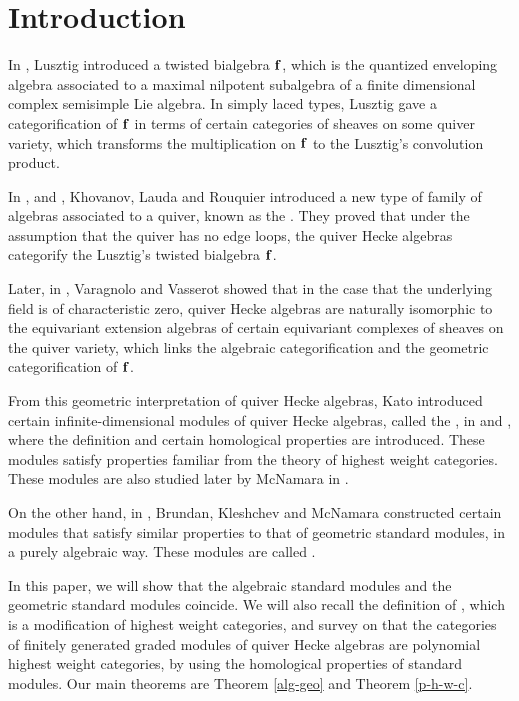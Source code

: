 
\chapter{Introduction}

In \cite{L}, Lusztig introduced a twisted bialgebra $\mathbf{f}$, which is 
the quantized enveloping algebra associated to a maximal nilpotent 
subalgebra of a finite dimensional complex semisimple Lie algebra.
In simply laced types, Lusztig gave a categorification of $\mathbf{f}$ in terms of certain
categories of sheaves on some quiver variety, which transforms
the multiplication on $\mathbf{f}$ to the Lusztig's convolution product.

In \cite{KL1}, \cite{KL2} and \cite{R}, Khovanov, Lauda and Rouquier
introduced a new type of family of algebras associated to a quiver,
known as the . They proved that under the assumption
that the quiver has no edge loops, the quiver Hecke algebras
categorify the Lusztig's twisted bialgebra $\mathbf{f}$.

Later, in \cite{VV}, Varagnolo and Vasserot showed that 
in the case that the underlying field is of characteristic zero,
quiver Hecke algebras are naturally isomorphic to the equivariant 
extension algebras of certain equivariant complexes of sheaves
on the quiver variety, which links the algebraic categorification
and the geometric categorification of $\mathbf{f}$.

From this geometric interpretation of quiver Hecke algebras,
Kato introduced certain infinite-dimensional modules of quiver Hecke algebras,
called the , in \cite{K} and \cite{K2},
where the definition and certain homological properties are introduced.
These modules satisfy properties familiar from the theory of
highest weight categories. 
These modules are also studied later by McNamara in \cite{Mc2}.

On the other hand, in \cite{BKM}, Brundan, Kleshchev and McNamara constructed
certain modules that satisfy similar properties to that of 
geometric standard modules, in a purely algebraic way.
These modules are called .

In this paper, we will show that the algebraic standard modules
and the geometric standard modules coincide. We will also
recall the definition of ,
which is a modification of highest weight categories, and survey on that
the categories of finitely generated graded modules of quiver Hecke algebras
are polynomial highest weight categories, by using the 
homological properties of standard modules. Our main theorems 
are Theorem \ref{alg-geo} and Theorem \ref{p-h-w-c}.

